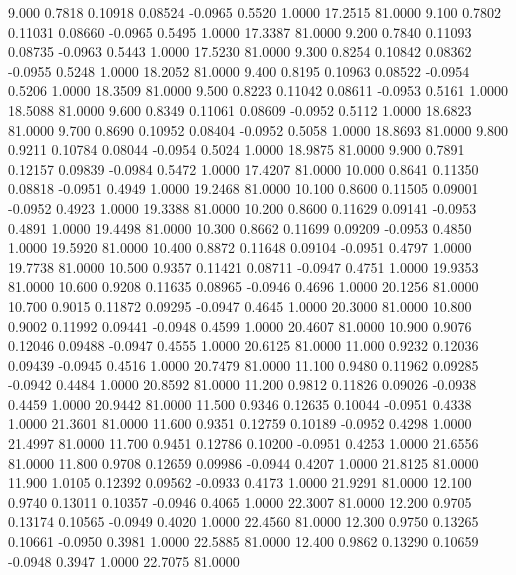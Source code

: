    9.000   0.7818   0.10918   0.08524  -0.0965   0.5520   1.0000  17.2515  81.0000
   9.100   0.7802   0.11031   0.08660  -0.0965   0.5495   1.0000  17.3387  81.0000
   9.200   0.7840   0.11093   0.08735  -0.0963   0.5443   1.0000  17.5230  81.0000
   9.300   0.8254   0.10842   0.08362  -0.0955   0.5248   1.0000  18.2052  81.0000
   9.400   0.8195   0.10963   0.08522  -0.0954   0.5206   1.0000  18.3509  81.0000
   9.500   0.8223   0.11042   0.08611  -0.0953   0.5161   1.0000  18.5088  81.0000
   9.600   0.8349   0.11061   0.08609  -0.0952   0.5112   1.0000  18.6823  81.0000
   9.700   0.8690   0.10952   0.08404  -0.0952   0.5058   1.0000  18.8693  81.0000
   9.800   0.9211   0.10784   0.08044  -0.0954   0.5024   1.0000  18.9875  81.0000
   9.900   0.7891   0.12157   0.09839  -0.0984   0.5472   1.0000  17.4207  81.0000
  10.000   0.8641   0.11350   0.08818  -0.0951   0.4949   1.0000  19.2468  81.0000
  10.100   0.8600   0.11505   0.09001  -0.0952   0.4923   1.0000  19.3388  81.0000
  10.200   0.8600   0.11629   0.09141  -0.0953   0.4891   1.0000  19.4498  81.0000
  10.300   0.8662   0.11699   0.09209  -0.0953   0.4850   1.0000  19.5920  81.0000
  10.400   0.8872   0.11648   0.09104  -0.0951   0.4797   1.0000  19.7738  81.0000
  10.500   0.9357   0.11421   0.08711  -0.0947   0.4751   1.0000  19.9353  81.0000
  10.600   0.9208   0.11635   0.08965  -0.0946   0.4696   1.0000  20.1256  81.0000
  10.700   0.9015   0.11872   0.09295  -0.0947   0.4645   1.0000  20.3000  81.0000
  10.800   0.9002   0.11992   0.09441  -0.0948   0.4599   1.0000  20.4607  81.0000
  10.900   0.9076   0.12046   0.09488  -0.0947   0.4555   1.0000  20.6125  81.0000
  11.000   0.9232   0.12036   0.09439  -0.0945   0.4516   1.0000  20.7479  81.0000
  11.100   0.9480   0.11962   0.09285  -0.0942   0.4484   1.0000  20.8592  81.0000
  11.200   0.9812   0.11826   0.09026  -0.0938   0.4459   1.0000  20.9442  81.0000
  11.500   0.9346   0.12635   0.10044  -0.0951   0.4338   1.0000  21.3601  81.0000
  11.600   0.9351   0.12759   0.10189  -0.0952   0.4298   1.0000  21.4997  81.0000
  11.700   0.9451   0.12786   0.10200  -0.0951   0.4253   1.0000  21.6556  81.0000
  11.800   0.9708   0.12659   0.09986  -0.0944   0.4207   1.0000  21.8125  81.0000
  11.900   1.0105   0.12392   0.09562  -0.0933   0.4173   1.0000  21.9291  81.0000
  12.100   0.9740   0.13011   0.10357  -0.0946   0.4065   1.0000  22.3007  81.0000
  12.200   0.9705   0.13174   0.10565  -0.0949   0.4020   1.0000  22.4560  81.0000
  12.300   0.9750   0.13265   0.10661  -0.0950   0.3981   1.0000  22.5885  81.0000
  12.400   0.9862   0.13290   0.10659  -0.0948   0.3947   1.0000  22.7075  81.0000
